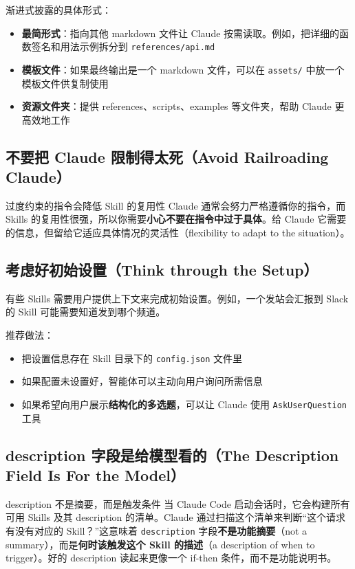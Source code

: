\documentclass[a4paper]{article}
\begin{document}
渐进式披露的具体形式：
\begin{itemize}
    \item \textbf{最简形式}：指向其他 markdown 文件让 Claude 按需读取。例如，把详细的函数签名和用法示例拆分到 \texttt{references/api.md}
    \item \textbf{模板文件}：如果最终输出是一个 markdown 文件，可以在 \texttt{assets/} 中放一个模板文件供复制使用
    \item \textbf{资源文件夹}：提供 references、scripts、examples 等文件夹，帮助 Claude 更高效地工作
\end{itemize}

\subsection{不要把 Claude 限制得太死（Avoid Railroading Claude）}

\begin{warningbox}{过度约束的指令会降低 Skill 的复用性}
Claude 通常会努力严格遵循你的指令，而 Skills 的复用性很强，所以你需要\textbf{小心不要在指令中过于具体}。给 Claude 它需要的信息，但留给它适应具体情况的灵活性（flexibility to adapt to the situation）。
\end{warningbox}

\subsection{考虑好初始设置（Think through the Setup）}

有些 Skills 需要用户提供上下文来完成初始设置。例如，一个发站会汇报到 Slack 的 Skill 可能需要知道发到哪个频道。

推荐做法：
\begin{itemize}
    \item 把设置信息存在 Skill 目录下的 \texttt{config.json} 文件里
    \item 如果配置未设置好，智能体可以主动向用户询问所需信息
    \item 如果希望向用户展示\textbf{结构化的多选题}，可以让 Claude 使用 \texttt{AskUserQuestion} 工具
\end{itemize}

\subsection{description 字段是给模型看的（The Description Field Is For the Model）}

\begin{importantbox}{description 不是摘要，而是触发条件}
当 Claude Code 启动会话时，它会构建所有可用 Skills 及其 description 的清单。Claude 通过扫描这个清单来判断``这个请求有没有对应的 Skill？''这意味着 \texttt{description} 字段\textbf{不是功能摘要}（not a summary），而是\textbf{何时该触发这个 Skill 的描述}（a description of when to trigger）。好的 description 读起来更像一个 if-then 条件，而不是功能说明书。
\end{importantbox}
\end{document}
